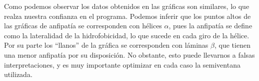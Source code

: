 \documentclass[12pt]{article}
\begin{document}
Como podemos observar los datos obtenidos en las gráficas son similares, lo que realza nuestra confianza en el programa. Podemos inferir que los puntos altos de las gráficas de anfipatía se corresponden con hélices $\alpha$, pues la anfipatía se define como la lateralidad de la hidrofobicidad, lo que sucede en cada giro de la hélice. Por su parte los ``llanos'' de la gráfica se corresponden con láminas $\beta$, que tienen una menor anfipatía por su disposición. No obstante, esto puede llevarnos a falsas interpretaciones, y es muy importante optimizar en cada caso la semiventana utilizada.
\newpage

\end{document}

